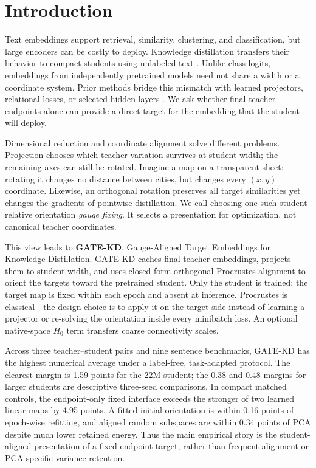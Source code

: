 \section{Introduction}
\label{sec:introduction}

Text embeddings support retrieval, similarity, clustering, and classification,
but large encoders can be costly to deploy. Knowledge distillation transfers
their behavior to compact students using unlabeled text
\citep{hinton2015distilling,reimers2020multilingual}. Unlike class logits,
embeddings from independently pretrained models need not share a width or a
coordinate system. Prior methods bridge this mismatch with learned projectors,
relational losses, or selected hidden layers
\citep{park2019rkd,tian2020crd,xu2023distillcse,zhang2024jasper,truong2025emo,talas}.
We ask whether final teacher endpoints alone can provide a direct target for the
embedding that the student will deploy.

Dimensional reduction and coordinate alignment solve different problems.
Projection chooses which teacher variation survives at student width; the
remaining axes can still be rotated. Imagine a map on a transparent sheet:
rotating it changes no distance between cities, but changes every $(x,y)$
coordinate. Likewise, an orthogonal rotation preserves all target similarities
yet changes the gradients of pointwise distillation. We call choosing one such
student-relative orientation \emph{gauge fixing}. It selects a presentation for
optimization, not canonical teacher coordinates.

This view leads to \textbf{GATE-KD}, Gauge-Aligned Target Embeddings for
Knowledge Distillation. GATE-KD caches final teacher embeddings, projects them
to student width, and uses closed-form orthogonal Procrustes alignment to orient
the targets toward the pretrained student. Only the student is trained; the
target map is fixed within each epoch and absent at inference. Procrustes is
classical---the design choice is to apply it on the target side instead of
learning a projector or re-solving the orientation inside every minibatch loss.
An optional native-space $H_0$ term transfers coarse connectivity scales.

Across three teacher--student pairs and nine sentence benchmarks, GATE-KD has
the highest numerical average under a label-free, task-adapted protocol. The
clearest margin is 1.59 points for the 22M student; the 0.38 and 0.48 margins for
larger students are descriptive three-seed comparisons. In compact matched
controls, the endpoint-only fixed interface exceeds the stronger of two learned
linear maps by 4.95 points. A fitted initial orientation is within 0.16 points
of epoch-wise refitting, and aligned random subspaces are within 0.34 points of
PCA despite much lower retained energy. Thus the main empirical story is the
student-aligned presentation of a fixed endpoint target, rather than frequent
alignment or PCA-specific variance retention.

